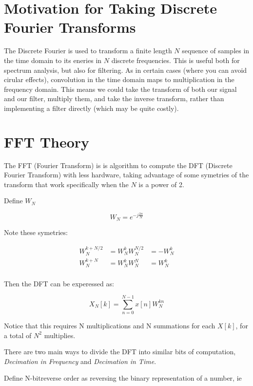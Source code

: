 \documentclass{article}
\begin{document}
\section{Motivation for Taking Discrete Fourier Transforms}

The Discrete Fourier is used to transform a finite length $N$ sequence of samples in the time domain to its eneries
in $N$ discrete frequencies. This is useful both for spectrum analysis, but also for filtering. As in certain cases
(where you can avoid cirular effects), convolution in the time domain maps to multiplication in the frequency domain.
This means we could take the transform of both our signal and our filter, multiply them, and take the inverse transform,
rather than implementing a filter directly (which may be quite costly).

\section{FFT Theory}
The FFT (Fourier Transform) is is algorithm to compute the DFT (Discrete Fourier Transform) with less hardware, taking advantage
of some symetries of the transform that work specifically when the $N$ is a power of 2.

Define $W_{N}$

\begin{equation*} W_{N} = e^{-j \frac{2 \pi}{N}} \end{equation*}

Note these symetries:

\begin{align*}
  W_{N}^{k+N/2} &= W_{N}^{k}W_{N}^{N/2} &= -W_{N}^{k} \\
  W_{N}^{k+N}   &= W_{N}^{k}W_{N}^{N}   &= W_{N}^{k} \\
\end{align*}

Then the DFT can be experessed as:

\begin{equation}  X_{N}\left[k\right] = \sum_{n=0}^{N-1} x\left[n\right] W_{N}^{kn} \end{equation}

Notice that this requires N multiplications and N summations for each $X\left[k\right]$, for a total of $N^{2}$ multiplies.

There are two main ways to divide the DFT into similar bits of computation,
\emph{Decimation in Frequency} and \emph{Decimation in Time}.

Define N-bitreverse order as reversing the binary representation of a number, ie
\end{document}
